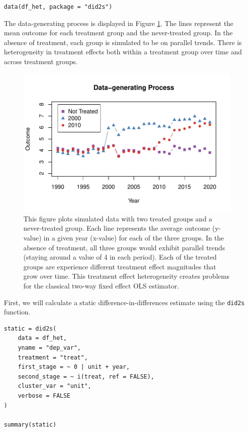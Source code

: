 \begin{verbatim}
data(df_het, package = "did2s")
\end{verbatim}

The data-generating process is displayed in Figure \ref{fig:ex-data}. The lines represent the mean outcome for each treatment group and the never-treated group. In the absence of treatment, each group is simulated to be on parallel trends. There is heterogeneity in treatment effects both within a treatment group over time and across treatment groups.

\begin{figure}
\includegraphics[width=1\linewidth]{did2s_files/figure-latex/ex-data-1} \caption{This figure plots simulated data with two treated groups and a never-treated group. Each line represents the average outcome (y-value) in a given year (x-value) for each of the three groups. In the absence of treatment, all three groups would exhibit parallel trends (staying around a value of 4 in each period). Each of the treated groups are experience different treatment effect magnitudes that grow over time. This treatment effect heterogeneity creates problems for the classical two-way fixed effect OLS estimator.}\label{fig:ex-data}
\end{figure}

First, we will calculate a static difference-in-differences estimate using the \texttt{did2s} function.

\begin{verbatim}
static = did2s(
    data = df_het, 
    yname = "dep_var", 
    treatment = "treat",
    first_stage = ~ 0 | unit + year, 
    second_stage = ~ i(treat, ref = FALSE),
    cluster_var = "unit", 
    verbose = FALSE
)

summary(static)
\end{verbatim}

